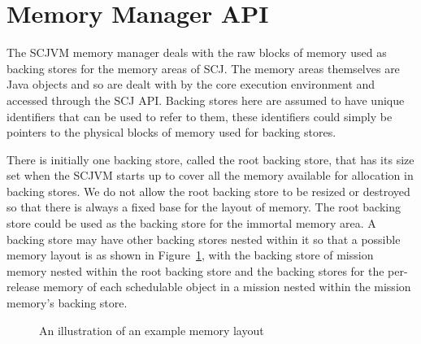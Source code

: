 \documentclass[a4paper,10pt]{report}
\begin{document}
\section{Memory Manager API}
\label{memory-manager-sec}

The SCJVM memory manager deals with the raw blocks of memory used as backing
stores for the memory areas of SCJ. The memory areas themselves are Java objects
and so are dealt with by the core execution environment and accessed through the
SCJ API. Backing stores here are assumed to have unique identifiers that can be
used to refer to them, these identifiers could simply be pointers to the
physical blocks of memory used for backing stores.

There is initially one backing store, called the root backing store, that has
its size set when the SCJVM starts up to cover all the memory available for
allocation in backing stores. We do not allow the root backing store to be
resized or destroyed so that there is always a fixed base for the layout of 
memory. The root backing store could be used as the backing store for the
immortal memory area. A backing store may have other backing stores nested
within it so that a possible memory layout is as shown in 
Figure~\ref{memory-fig}, with the backing store of mission memory nested within
the root backing store and the backing stores for the per-release memory of each
schedulable object in a mission nested within the mission memory's backing
store.

\begin{figure}[ht]
  \centering
  \caption{An illustration of an example memory layout}
  \label{memory-fig}
\end{figure}
\end{document}
